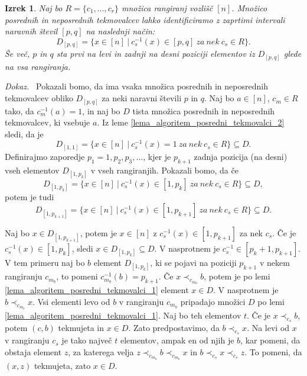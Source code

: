 \documentclass[a4paper, 12pt]{book}
\newtheorem{izrek}{Izrek}[chapter]
\newenvironment{dokaz}{\emph{Dokaz.}\ }{\hspace{\fill}{$\Box$}}
\begin{document}
\begin{izrek}
    Naj bo $R = \{ c_1, \dots, c_r \}$ množica rangiranj vozlišč $[n]$. Množico posrednih in neposrednih tekmovalcev lahko identificiramo z zaprtimi intervali naravnih števil $[p, q]$ na naslednji način: 
    \[
        D_{[p, q]} = \{ x \in [n] \ | \ c_s^{-1}(x) \in [p, q] \ za \ nek \ c_s \in R\}.
    \]
    Še več, $p$ in $q$ sta prvi na levi in zadnji na desni poziciji elementov iz $D_{[p, q]}$ glede na vsa rangiranja.
\end{izrek}
\begin{dokaz}
    Pokazali bomo, da ima vsaka množica posrednih in neposrednih tekmovalcev obliko $D_{[p, q]}$ za neki naravni števili $p$ in $q$. Naj bo $a \in [n]$, $c_m \in R$ tako, da $c_m^{-1}(a) = 1$, in naj bo $D$ tista množica posrednih in neposrednih tekmovalcev, ki vsebuje $a$. Iz leme \ref{lema_algoritem_posredni_tekmovalci_2} sledi, da je 
    \[ 
        D_{[1,1]} = \{ x \in [n] \ | \ c_s^{-1}(x) = 1 \ za \ nek \ c_s \in R \} \subseteq D.
    \] 
    Definirajmo zaporedje $p_1\!=\!1, p_2, p_3, \dots$, kjer je $p_{k+1}$ zadnja pozicija (na desni) vseh elementov $D_{[1, p_k]}$ v vseh rangiranjih. 
    Pokazali bomo, da če 
    \[
        D_{[1, p_k]} = \{ x \in [n] \ | \ c_s^{-1}(x) \in [1, p_k] \ za \ nek \ c_s \in R\} \subseteq D,
    \]
    potem je tudi 
    \[
        D_{[1, p_{k+1}]} = \{ x \in [n] \ | \ c_s^{-1}(x) \in [1, p_{k+1}] \ za \ nek \ c_s \in R\} \subseteq D.
    \] 
    
    Naj bo $x \in D_{[1, p_{k+1}]}$, potem je $x \in [n]$ z $c_s^{-1}(x) \in [1, p_{k+1}]$ za nek $c_s$. Če je $c_s^{-1}(x) \in [1, p_k]$, sledi $x \in D_{[1, p_k]} \subseteq D$. V nasprotnem je $c_s^{-1} \in [p_k + 1, p_{k+1}]$. V tem primeru naj bo $b$ element $D_{[1,p_k]}$, ki se pojavi na poziciji $p_{k+1}$ v nekem rangiranju $c_{m_b}$, to pomeni $c_{m_b}^{-1}(b) = p_{k+1}$. Če $x \prec_{c_{m_b}} b$, potem je po lemi \ref{lema_algoritem_posredni_tekmovalci_1} element $x \in D$. V nasprotnem je $b \prec_{c_{m_b}} x$. Vsi elementi levo od $b$ v rangiranju $c_{m_b}$ pripadajo množici $D$ po lemi \ref{lema_algoritem_posredni_tekmovalci_1}. Naj bo teh elementov $t$. Če je $x \prec_{c_s} b$, potem $(c, b)$ tekmujeta in $x \in D$. Zato predpostavimo, da $b \prec_{c_s} x$. Na levi od $x$ v rangiranju $c_s$ je tako največ $t$ elementov, ampak en od njih je $b$, kar pomeni, da obstaja element $z$, za katerega velja $z \prec_{c_{m_b}} b \prec_{c_{m_b}} x$ in $b \prec_{c_s} x \prec_{c_s} z$. To pomeni, da $(x, z)$ tekmujeta, zato $x \in D$.


\end{dokaz}
\end{document}
